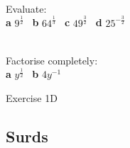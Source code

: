 \documentclass[fleqn, twoside]{article}
\begin{document}
\newpage
\begin{examplebox}{}{}
    \\ %
    Evaluate:
    \vspace{1.5mm}\\
    \textbf{a}\hspace{2mm} $9^{\textstyle\frac{1}{2}}$         \hspace{15mm} \
    \textbf{b}\hspace{2mm} $64^{\textstyle\frac{1}{3}}$        \hspace{15mm} \
    \textbf{c}\hspace{2mm} $49^{\textstyle\frac{3}{2}}$        \hspace{15mm} \
    \textbf{d}\hspace{2mm} $25^{-\textstyle\frac{3}{2}}$       \hspace{15mm}
\end{examplebox}
\vspace{9cm}
\begin{examplebox}{}{}
    \\ %
    Factorise completely:
    \vspace{1.5mm}\\
    \textbf{a}\hspace{2mm} $y^{\textstyle\frac{1}{2}}$        \hspace{15mm} \
    \textbf{b}\hspace{2mm} $4y^{-1}$                          \hspace{7mm}
\end{examplebox}

\vfill
\begin{practice*}{Exercise 1D}{}
\end{practice*}
\newpage



\subsection{Surds}
\vspace{-6mm}
\end{document}
